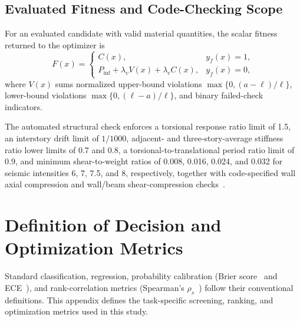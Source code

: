 \subsection{Evaluated Fitness and Code-Checking Scope}

For an evaluated candidate with valid material quantities, the scalar fitness returned to the optimizer is
\begin{equation}
F(x)=
\begin{cases}
C(x), & y_f(x)=1,\\
P_{\mathrm{inf}}+\lambda_v V(x)+\lambda_c C(x), & y_f(x)=0,
\end{cases}
\label{eq:true_fitness}
\end{equation}
where $V(x)$ sums normalized upper-bound violations $\max\{0,(a-\ell)/\ell\}$, lower-bound violations $\max\{0,(\ell-a)/\ell\}$, and binary failed-check indicators.

The automated structural check enforces a torsional response ratio limit of 1.5, an interstory drift limit of $1/1000$, adjacent- and three-story-average stiffness ratio lower limits of 0.7 and 0.8, a torsional-to-translational period ratio limit of 0.9, and minimum shear-to-weight ratios of 0.008, 0.016, 0.024, and 0.032 for seismic intensities 6, 7, 7.5, and 8, respectively, together with code-specified wall axial compression and wall/beam shear-compression checks~\cite{GB500112010,GB500102010}.


\section{Definition of Decision and Optimization Metrics}
\label{app:evaluation_metrics}

Standard classification, regression, probability calibration (Brier score~\cite{Brier1950} and ECE~\cite{Naeini2015}), and rank-correlation metrics (Spearman's $\rho_s$~\cite{Spearman1904}) follow their conventional definitions. This appendix defines the task-specific screening, ranking, and optimization metrics used in this study.

